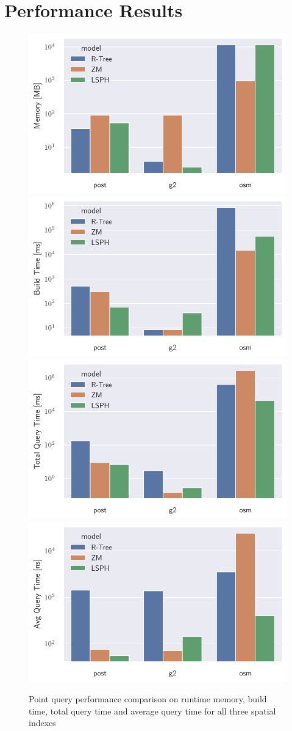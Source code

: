 \section{Performance Results}

\begin{figure}
    \includegraphics[width=.5\textwidth]{Figures/memory.pdf}\hfill
    \includegraphics[width=.5\textwidth]{Figures/build_time.pdf}
    \\[\smallskipamount]
    \includegraphics[width=.5\textwidth]{Figures/query_time.pdf}\hfill
    \includegraphics[width=.5\textwidth]{Figures/avg_query_time.pdf}
    \caption{Point query performance comparison on runtime memory, build time, total query time and average query time for all three spatial indexes}\label{fig:performance}
\end{figure}




